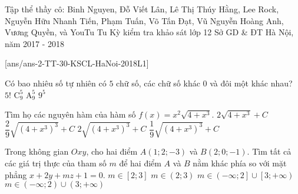 
\begin{name}
	{Tập thể thầy cô: Binh Nguyen, Đỗ Viết Lân, Lê Thị Thúy Hằng, Lee Rock, Nguyễn Hữu Nhanh Tiến, Phạm Tuấn, Võ Tấn Đạt, Vũ Nguyễn Hoàng Anh, Vương Quyền, và YouTu Tu}
	{Kỳ kiểm tra khảo sát lớp 12 Sở GD \& ĐT Hà Nội, năm 2017 - 2018}
\end{name}
[ans/ans-2-TT-30-KSCL-HaNoi-2018L1]


\begin{ex}%
	Có bao nhiêu số tự nhiên có $5$ chữ số, các chữ số khác $0$ và đôi một khác nhau?
	\choice
	{$5!$}
	{$\mathrm{C}_9^5$}
	{\True $\mathrm{A}_9^5$}
	{ $9^5$}
\end{ex}

\begin{ex}%
	Tìm họ các nguyên hàm của hàm số $f(x)=x^2\sqrt{4+x^3}$.
	\choice
	{ $2\sqrt{4+x^3}+C$}
	{\True$ \dfrac{2}{9}\sqrt{\left(4+x^3\right)^3} +C$}
	{$2\sqrt{\left(4+x^3\right)^3}+C$}
	{$\dfrac{1}{9}\sqrt{\left(4+x^3\right)^3}+C$}
\end{ex}


\begin{ex}%
	Trong không gian $Oxy$, cho hai điểm $A(1;2;-3)$ và $B(2;0;-1)$. Tìm tất cả các giá trị thực của tham số $m$ để hai điểm $A$ và $B$ nằm khác phía so với mặt phẳng $x+2y+mz+1=0$.
	\choice
	{$m \in \left[2;3\right]$}
	{\True$m \in \left(2;3\right)$}
	{ $m\in \left(-\infty;2\right]\cup \left[ 3; +\infty\right)$}
	{$m\in \left(-\infty;2\right) \cup \left(3;+\infty\right)$}
\end{ex}

